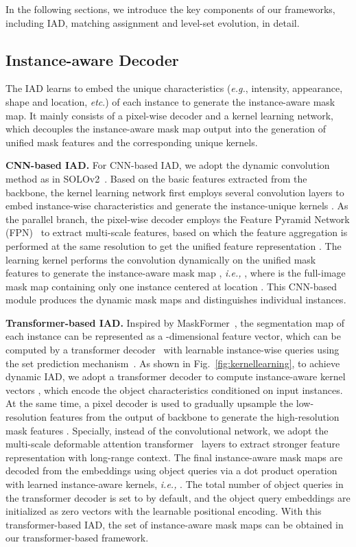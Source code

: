 \documentclass[12pt,onecolumn,letterpaper]{article}
\begin{document}
In the following sections, we introduce the key components of our frameworks, including IAD, matching assignment and level-set evolution, in detail. 


\subsection{Instance-aware Decoder}

The IAD learns to embed the unique characteristics (\textit{e.g.}, intensity, appearance, shape and location, \textit{etc}.) of each instance to generate the instance-aware mask map.  It mainly consists of a pixel-wise decoder and a kernel learning network, which decouples the instance-aware mask map output into the generation of unified mask features and the corresponding unique kernels.

\textbf{CNN-based IAD.}
For CNN-based IAD, we adopt the dynamic convolution method as in SOLOv2~\cite{wang2020solov2, PMAI2021solo}.
Based on the basic features  extracted from the backbone, the  kernel learning network first employs several convolution layers to embed instance-wise characteristics and generate the instance-unique kernels .
As the parallel branch, the pixel-wise decoder employs the Feature Pyramid Network (FPN)~\cite{cvpr2017_FPN} to extract multi-scale features, based on which the feature aggregation is performed at the same resolution to get the unified feature representation .
The learning kernel  performs the convolution dynamically on the unified mask features  to generate the instance-aware mask map , \textit{i.e.,} , where  is the full-image mask map containing only one instance centered at location . This CNN-based module produces the dynamic mask maps and distinguishes individual instances.

\textbf{Transformer-based IAD.}
Inspired by MaskFormer~\cite{nips2021maskformer}, 
the segmentation map of each instance can be represented as a -dimensional feature vector, which can be computed by a transformer decoder~\cite{nips2017attention} with  learnable instance-wise queries using the set prediction mechanism~\cite{eccv2020-detr}.
As shown in Fig.~\ref{fig:kernellearning}, 
to achieve dynamic IAD, we adopt a transformer decoder to compute  instance-aware kernel vectors , which encode the object characteristics conditioned on input instances.
At the same time, a pixel decoder is used to gradually upsample the low-resolution features from the output of backbone to generate the high-resolution mask features . Specially, instead of the convolutional network, we adopt the multi-scale deformable attention transformer~\cite{zhu2020deformable} layers to extract stronger feature representation with long-range context.
The final instance-aware mask maps are decoded from the embeddings using object queries via a dot product operation with learned instance-aware kernels, \textit{i.e.,} 
.  The total number of object queries in the transformer decoder is set to  by default, and the object query embeddings are initialized as zero vectors with the learnable positional encoding.
With this transformer-based IAD, the set of instance-aware mask maps can be obtained in our transformer-based framework.
\end{document}
